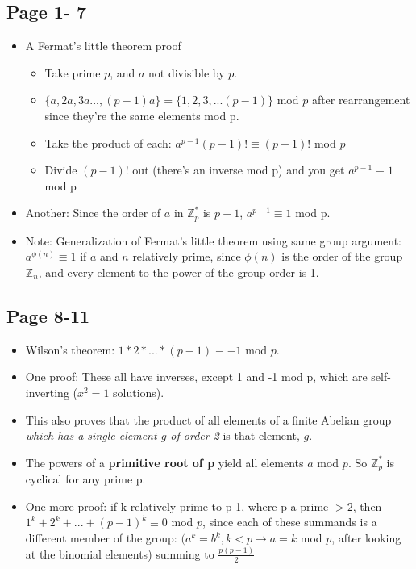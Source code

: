 \documentclass[11pt, oneside]{article}   	%
\begin{document}
\subsection{Page 1- 7}
\begin{itemize}
\item A Fermat's little theorem proof
 \begin{itemize}
  \item Take prime $p$, and $a$ not divisible by $p$.
   \item $\{a, 2a, 3a ... , (p-1)a\} = \{1, 2, 3, ... (p-1)\}$ mod $p$ after rearrangement since they're the same elements mod p.
   \item Take the product of each: $a^{p-1}(p-1)! \equiv (p-1)!$ mod $p$
   \item Divide $(p-1)!$ out (there's an inverse mod p) and you get $a^{p-1} \equiv 1$ mod p
  \end{itemize}
 \item Another: Since the order of $a$ in $\mathbb{Z}_p^*$ is $p-1$, $a^{p-1} \equiv 1$ mod p.
 \item Note: Generalization of Fermat's little theorem using same group argument: $a^{\phi(n)} \equiv 1$ if $a$ and $n$ relatively prime, since $\phi(n)$ is the order of the group $\mathbb{Z}_n$, and every element to the power of the group order is 1.
 \end{itemize}
 
 \subsection{Page 8-11}
 \begin{itemize}
 \item Wilson's theorem: $1 * 2 * ... * (p-1) \equiv -1$ mod $p$.
 \item One proof: These all have inverses, except 1 and -1 mod p, which are self-inverting ($x^2 = 1$ solutions).
 \item This also proves that the product of all elements of a finite Abelian group \emph{which has a single element $g$ of order 2} is that element, $g$.
 \item The powers of a \textbf{primitive root of p} yield all elements $a$ mod $p$.  So $\mathbb{Z}_p^*$ is cyclical for any prime p.
\item One more proof: if k relatively prime to p-1, where p a prime $> 2$, then $1^k + 2^k + ... + (p-1)^k \equiv 0$ mod $p$, since each of these summands is a different member of the group: $(a^k = b^k, k < p \rightarrow a = k $ mod $p$, after looking at the binomial elements) summing to $\frac{p(p-1)}{2}$
 \end{itemize}
 
\end{document}
